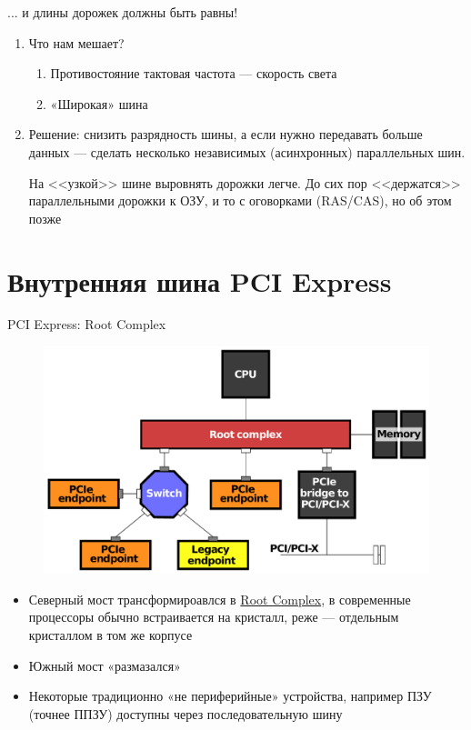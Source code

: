 \documentclass[xetex,aspectratio=43]{beamer}
\begin{document}
\begin{frame}{... и длины дорожек должны быть равны!}
    \begin{enumerate}
        \item Что нам мешает?
        \begin{enumerate}
            \item Противостояние тактовая частота --- скорость света
            \item «Широкая» шина
        \end{enumerate}
        \pause
        \item \alert{Решение: снизить разрядность шины, а если нужно передавать больше данных --- сделать несколько независимых (асинхронных) параллельных шин.}

        На <<узкой>> шине выровнять дорожки легче. До сих пор <<держатся>> параллельными дорожки к ОЗУ, и то с оговорками (RAS/CAS), но об этом позже
    \end{enumerate}
\end{frame}

\section{Внутренняя шина PCI Express}

\begin{frame}{PCI Express: Root Complex}
	\begin{figure}
        \includegraphics[height=0.5\textheight]{img/04.Example_PCI_Express_Topology.pdf}
    \end{figure}
    \begin{itemize}
        \item Северный мост трансформироавлся в \href{https://en.wikipedia.org/wiki/Root_complex}{Root Complex}, в современные процессоры обычно встраивается на кристалл, реже --- отдельным кристаллом в том же корпусе
        \item Южный мост «размазался»
        \item Некоторые традиционно «не периферийные» устройства, например ПЗУ (точнее ППЗУ) доступны через последовательную шину
    \end{itemize}
\end{frame}
\end{document}
